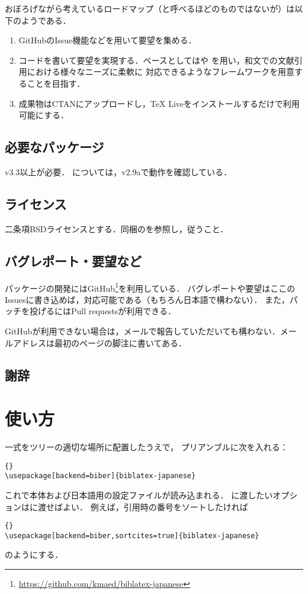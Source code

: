 \documentclass[lualatex,ja=standard,magstyle=real]{bxjsarticle}
\begin{document}
おぼろげながら考えているロードマップ（と呼べるほどのものではないが）は以下のようである．
\begin{enumerate}
\item GitHubのIssue機能などを用いて要望を集める．
\item コードを書いて要望を実現する．ベースとしてはや
  を用い，和文での文献引用における様々なニーズに柔軟に
  対応できるようなフレームワークを用意することを目指す．
\item 成果物はCTANにアップロードし，\TeX{} Liveをインストールするだけで利用可能にする．
\end{enumerate}

\subsection{必要なパッケージ}
 v3.3以上が必要．
については，v2.9aで動作を確認している．

\subsection{ライセンス}
二条項BSDライセンスとする．同梱のを参照し，従うこと．

\subsection{バグレポート・要望など}
パッケージの開発にはGitHub\footnote{\url{https://github.com/kmaed/biblatex-japanese}}を利用している．
バグレポートや要望はここのIssuesに書き込めば，対応可能である（もちろん日本語で構わない）．
また，パッチを投げるにはPull requestsが利用できる．

GitHubが利用できない場合は，メールで報告していただいても構わない．メールアドレスは最初のページの脚注に書いてある．

\subsection{謝辞}


\section{使い方}
一式をツリーの適切な場所に配置したうえで，
プリアンブルに次を入れる：
\begin{lstlisting}[style=latex]{}
\usepackage[backend=biber]{biblatex-japanese}
\end{lstlisting}
これで本体および日本語用の設定ファイルが読み込まれる．
に渡したいオプションはに渡せばよい．
例えば，引用時の番号をソートしたければ
\begin{lstlisting}[style=latex]{}
\usepackage[backend=biber,sortcites=true]{biblatex-japanese}
\end{lstlisting}
のようにする．
\end{document}
